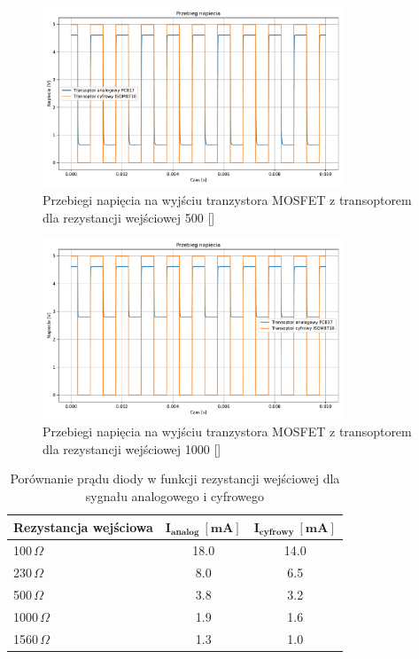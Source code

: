 \documentclass[11pt]{article}
\begin{document}
\begin{figure}[H]
\centering
\includegraphics[width=0.8\textwidth]{aun1_gate_circuit_digital_vs_analog_rin500ohm.pdf}
\caption{Przebiegi napięcia na wyjściu tranzystora MOSFET z transoptorem dla rezystancji wejściowej 500 [\Omega]}
\end{figure}

\begin{figure}[H]
\centering
\includegraphics[width=0.8\textwidth]{aun1_gate_circuit_digital_vs_analog_rin1000ohm.pdf}
\caption{Przebiegi napięcia na wyjściu tranzystora MOSFET z transoptorem dla rezystancji wejściowej 1000 [\Omega]}
\end{figure}

\begin{table}[H]
\centering
\begin{tabular}{|l|c|c|}
\hline
\textbf{Rezystancja wejściowa} & \(\mathbf{I_{analog} \ [mA]}\) & \(\mathbf{I_{cyfrowy} \ [mA]}\) \\
\hline
100\,$\Omega$ & 18.0 & 14.0 \\
\hline
230\,$\Omega$ & 8.0 & 6.5 \\
\hline
500\,$\Omega$ & 3.8 & 3.2 \\
\hline
1000\,$\Omega$ & 1.9 & 1.6 \\
\hline
1560\,$\Omega$ & 1.3 & 1.0 \\
\hline
\end{tabular}
\caption{Porównanie prądu diody w funkcji rezystancji wejściowej dla sygnału analogowego i cyfrowego}
\label{tab:diode_current_comparison}
\end{table}
\end{document}
